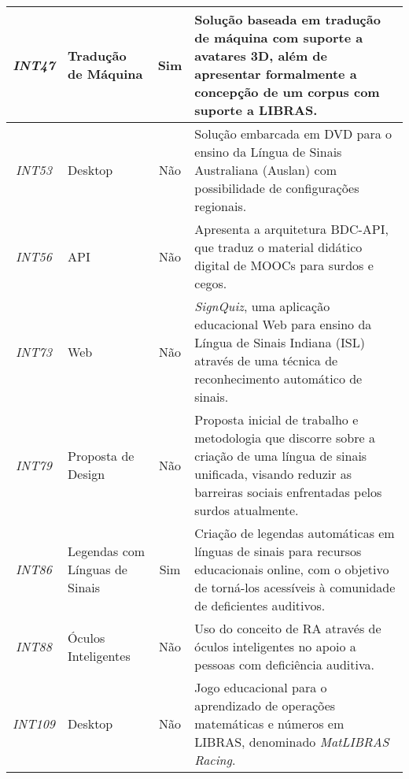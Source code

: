 \begin{small}
\begin{longtable}{|c|>{\centering\arraybackslash}p{2.75cm}|c|p{10cm}|}
\textit{INT47} & Tradução de Máquina & Sim & Solução baseada em tradução de máquina com suporte a avatares 3D, além de apresentar formalmente a concepção de um corpus com suporte a LIBRAS. \\ \hline
\textit{INT53} & Desktop & Não & Solução embarcada em DVD para o ensino da Língua de Sinais Australiana (Auslan) com possibilidade de configurações regionais. \\ \hline
\textit{INT56} & API & Não & Apresenta a arquitetura BDC-API, que traduz o material didático digital de MOOCs para surdos e cegos. \\ \hline
\textit{INT73} & Web & Não & \textit{SignQuiz}, uma aplicação educacional Web para ensino da Língua de Sinais Indiana (ISL) através de uma técnica de reconhecimento automático de sinais. \\ \hline
\textit{INT79} & Proposta de Design & Não & Proposta inicial de trabalho e metodologia que discorre sobre a criação de uma língua de sinais unificada, visando reduzir as barreiras sociais enfrentadas pelos surdos atualmente. \\ \hline
\textit{INT86} & Legendas com Línguas de Sinais & Sim & Criação de legendas automáticas em línguas de sinais para recursos educacionais online, com o objetivo de torná-los acessíveis à comunidade de deficientes auditivos. \\ \hline
\textit{INT88} & Óculos Inteligentes & Não & Uso do conceito de RA através de óculos inteligentes no apoio a pessoas com deficiência auditiva. \\ \hline
\textit{INT109} & Desktop & Não & Jogo educacional para o aprendizado de operações matemáticas e números em LIBRAS, denominado \textit{MatLIBRAS Racing}. \\ \hline
\end{longtable}
\end{small}
